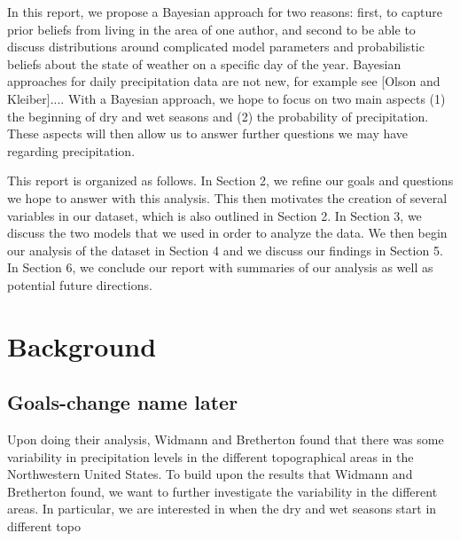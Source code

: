 \documentclass{article}
\begin{document}
In this report, we propose a Bayesian approach for two reasons: first, to capture prior beliefs  from living in the area of one author, and second to be able to discuss distributions around complicated model parameters and probabilistic beliefs about the state of weather on a specific day of the year. Bayesian approaches for daily precipitation data are not new, for example see [Olson and Kleiber].... With a Bayesian approach, we hope to focus on two main aspects (1) the beginning of dry and wet seasons and (2) the probability of precipitation. These aspects will then allow us to answer further questions we may have regarding precipitation. 

This report is organized as follows. In Section 2, we refine our goals and questions we hope to answer with this analysis. This then motivates the creation of several variables in our dataset, which is also outlined in Section 2. In Section 3, we discuss the two models that we used in order to analyze the data.  We then begin our analysis of the dataset in Section 4 and we discuss our findings in Section 5. In Section 6, we conclude our report with summaries of our analysis as well as potential future directions.

\section{Background}

\subsection{Goals-change name later}
Upon doing their analysis, Widmann and Bretherton found that there was some variability in precipitation levels in the different topographical areas in the Northwestern United States. To build upon the results that Widmann and Bretherton found, we want to further investigate the variability in the different areas. In particular, we are interested in when the dry and wet seasons start in different topo
\end{document}
